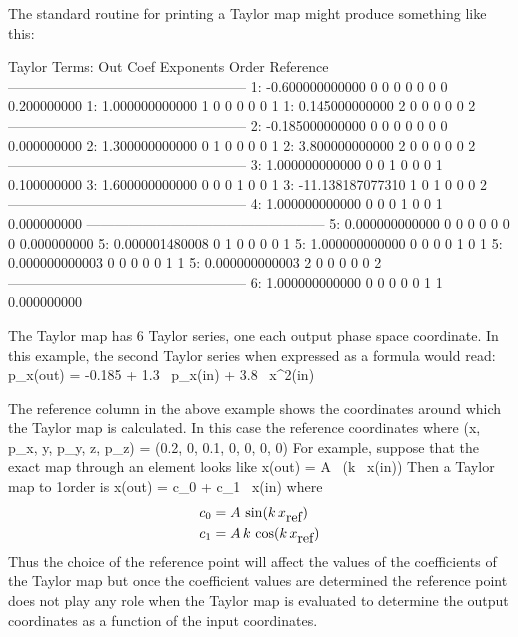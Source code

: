 The standard \bmad routine for printing a Taylor map might produce something 
like this: 
\begin{example}
   Taylor Terms:
    Out     Coef              Exponents           Order        Reference
   ---------------------------------------------------
      1:     -0.600000000000  0  0  0  0  0  0        0       0.200000000
      1:      1.000000000000  1  0  0  0  0  0        1
      1:      0.145000000000  2  0  0  0  0  0        2
   ---------------------------------------------------
      2:     -0.185000000000  0  0  0  0  0  0        0       0.000000000
      2:      1.300000000000  0  1  0  0  0  0        1
      2:      3.800000000000  2  0  0  0  0  0        2
   ---------------------------------------------------
      3:      1.000000000000  0  0  1  0  0  0        1       0.100000000
      3:      1.600000000000  0  0  0  1  0  0        1
      3:    -11.138187077310  1  0  1  0  0  0        2
   ---------------------------------------------------
      4:      1.000000000000  0  0  0  1  0  0        1       0.000000000
   ---------------------------------------------------
      5:      0.000000000000  0  0  0  0  0  0        0       0.000000000
      5:      0.000001480008  0  1  0  0  0  0        1
      5:      1.000000000000  0  0  0  0  1  0        1
      5:      0.000000000003  0  0  0  0  0  1        1
      5:      0.000000000003  2  0  0  0  0  0        2
   ---------------------------------------------------
      6:      1.000000000000  0  0  0  0  0  1        1       0.000000000
\end{example}
The Taylor map has 6 Taylor series, one each output phase space coordinate.
In this example, the second Taylor series when expressed as a formula would
read:
\Begineq
  p_x(out) = -0.185 + 1.3 \, p_x(in) + 3.8 \, x^2(in)
\Endeq

The reference column in the above example shows the coordinates around
which the Taylor map is calculated. In this case the reference
coordinates where 
\Begineq
  (x, p_x, y, p_y, z, p_z) = (0.2, 0, 0.1, 0, 0, 0, 0)
\Endeq
For example, suppose that the exact map through an element looks like
\Begineq
  x(out) = A \, \sin(k \, x(in))
\Endeq
Then a Taylor map to 1\St order is
\Begineq
  x(out) = c_0 + c_1 \, x(in)
\Endeq
where
\begin{align}
  c_0 &= A \, \sin(k \, x_{\mbox{ref}}) \nonumber \\ 
  c_1 &= A \, k \, \cos(k \, x_{\mbox{ref}})
\end{align}
Thus the choice of the reference point will affect the values of the
coefficients of the Taylor map but once the coefficient values are
determined the reference point does not play any role when the Taylor
map is evaluated to determine the output coordinates as a function of
the input coordinates.

